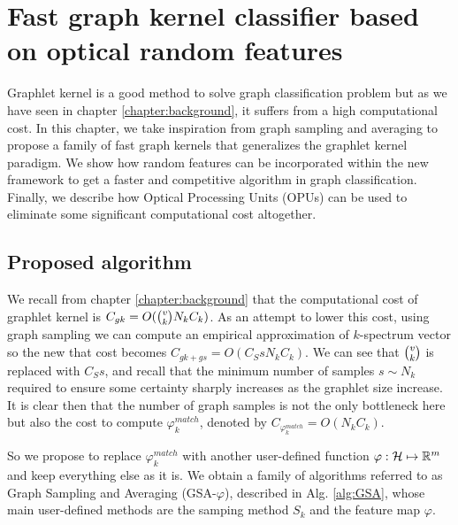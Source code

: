 \chapter{Fast graph kernel classifier based on optical random features }
\label{chapter:fast_algorithm}
\newtheorem{lemma}{Lemma} 
Graphlet kernel  is a good method to solve graph classification problem but as we have seen in chapter \ref{chapter:background}, it suffers from a high computational cost. In this chapter, we take inspiration from graph sampling and averaging to propose a family of fast graph kernels that generalizes the graphlet kernel paradigm. We show how random features can be incorporated within the new framework to get a faster and competitive algorithm in graph classification. Finally, we describe how Optical Processing Units (OPUs) can be used to eliminate some significant computational cost altogether.

\section{Proposed algorithm}
We recall from chapter \ref{chapter:background} that the computational cost of graphlet kernel is $C_{gk}= O(\tbinom{v}{k} N_k C_k)$. As an attempt to lower this cost, using graph sampling we can compute an empirical approximation of $k$-spectrum vector so the new that cost becomes $C_{gk + gs}= O(C_S s N_k C_k)$. We can see that $\tbinom{v}{k}$ is replaced with $C_S s$, and recall that the minimum number of samples $s \sim N_k$ required to ensure some certainty sharply increases as the graphlet size increase. It is clear then that the number of graph samples is not the only bottleneck here but also the cost to compute $\varphi_k^{match}$, denoted by $C_{\varphi_k^{match}}=O(N_k C_k)$.

So we propose to replace $\varphi^{match}_k$ with another user-defined function $\varphi:\mathcal{H} \mapsto\mathbb{R}^m$ and keep everything else as it is. We obtain a family of algorithms referred to as Graph Sampling and Averaging (GSA-$\varphi$), described in Alg. \ref{alg:GSA}, whose main user-defined methods are the samping method $S_k$ and the feature map $\varphi$.

